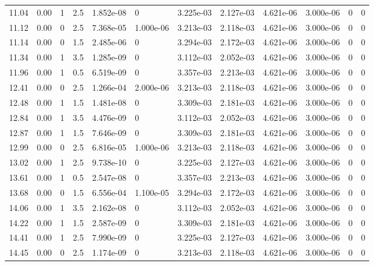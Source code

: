 \documentclass[preview]{standalone}
\begin{document}
{{{\begin{tabular}{L{1.2cm}C{1.2cm} C{0.3cm}C{0.5cm} C{1.4cm}C{1.4cm} C{1.4cm}C{1.4cm} C{1.6cm}C{1.6cm} C{1.6cm}C{1.6cm}}
  11.04  &  0.00  & 1     & 2.5 &  1.852e-08  & 0  &  3.225e-03&   2.127e-03& 4.621e-06 & 3.000e-06   &  0 & 0  \\ 
  11.12  &  0.00  & 0     & 2.5 &  7.368e-05  & 1.000e-06  &  3.213e-03&   2.118e-03& 4.621e-06 & 3.000e-06   &  0 & 0  \\ 
  11.14  &  0.00  & 0     & 1.5 &  2.485e-06  & 0  &  3.294e-03&   2.172e-03& 4.621e-06 & 3.000e-06   &  0 & 0  \\ 
  11.34  &  0.00  & 1     & 3.5 &  1.285e-09  & 0  &  3.112e-03&   2.052e-03& 4.621e-06 & 3.000e-06   &  0 & 0  \\ 
  11.96  &  0.00  & 1     & 0.5 &  6.519e-09  & 0  &  3.357e-03&   2.213e-03& 4.621e-06 & 3.000e-06   &  0 & 0  \\ 
  12.41  &  0.00  & 0     & 2.5 &  1.266e-04  & 2.000e-06  &  3.213e-03&   2.118e-03& 4.621e-06 & 3.000e-06   &  0 & 0  \\ 
  12.48  &  0.00  & 1     & 1.5 &  1.481e-08  & 0  &  3.309e-03&   2.181e-03& 4.621e-06 & 3.000e-06   &  0 & 0  \\ 
  12.84  &  0.00  & 1     & 3.5 &  4.476e-09  & 0  &  3.112e-03&   2.052e-03& 4.621e-06 & 3.000e-06   &  0 & 0  \\ 
  12.87  &  0.00  & 1     & 1.5 &  7.646e-09  & 0  &  3.309e-03&   2.181e-03& 4.621e-06 & 3.000e-06   &  0 & 0  \\ 
  12.99  &  0.00  & 0     & 2.5 &  6.816e-05  & 1.000e-06  &  3.213e-03&   2.118e-03& 4.621e-06 & 3.000e-06   &  0 & 0  \\ 
  13.02  &  0.00  & 1     & 2.5 &  9.738e-10  & 0  &  3.225e-03&   2.127e-03& 4.621e-06 & 3.000e-06   &  0 & 0  \\ 
  13.61  &  0.00  & 1     & 0.5 &  2.547e-08  & 0  &  3.357e-03&   2.213e-03& 4.621e-06 & 3.000e-06   &  0 & 0  \\ 
  13.68  &  0.00  & 0     & 1.5 &  6.556e-04  & 1.100e-05  &  3.294e-03&   2.172e-03& 4.621e-06 & 3.000e-06   &  0 & 0  \\ 
  14.06  &  0.00  & 1     & 3.5 &  2.162e-08  & 0  &  3.112e-03&   2.052e-03& 4.621e-06 & 3.000e-06   &  0 & 0  \\ 
  14.22  &  0.00  & 1     & 1.5 &  2.587e-09  & 0  &  3.309e-03&   2.181e-03& 4.621e-06 & 3.000e-06   &  0 & 0  \\ 
  14.41  &  0.00  & 1     & 2.5 &  7.990e-09  & 0  &  3.225e-03&   2.127e-03& 4.621e-06 & 3.000e-06   &  0 & 0  \\ 
  14.45  &  0.00  & 0     & 2.5 &  1.174e-09  & 0  &  3.213e-03&   2.118e-03& 4.621e-06 & 3.000e-06   &  0 & 0  \\ 

\end{tabular}}}}
\end{document}
